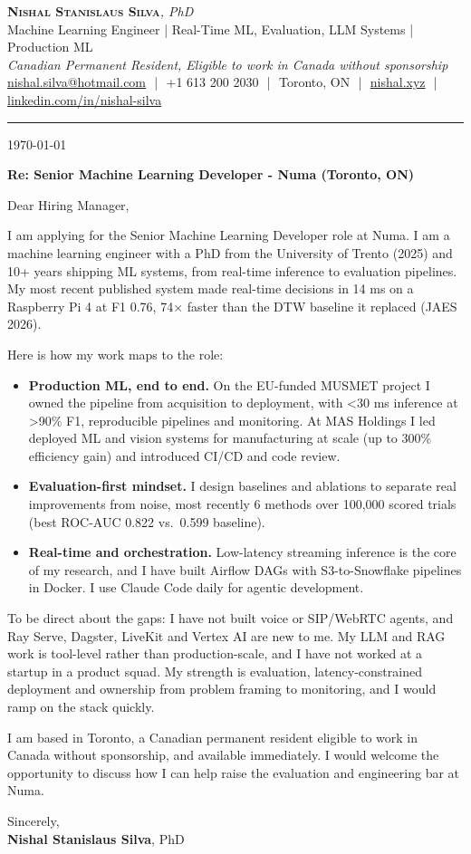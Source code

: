 \documentclass[11pt]{article}
\makeatletter
\newcommand{\clName}{Nishal Stanislaus Silva}
\newcommand{\clEmail}{nishal.silva@hotmail.com}
\newcommand{\clPhone}{+1 613 200 2030}
\newcommand{\clCity}{Toronto, ON}
\newcommand{\clSite}{https://nishal.xyz}
\newcommand{\clLinkedIn}{https://www.linkedin.com/in/nishal-silva}
\newcommand{\clStatus}{Canadian Permanent Resident, Eligible to work in Canada without sponsorship}
\newcommand{\clTagline}{Machine Learning Engineer | Real-Time ML, Evaluation, LLM Systems | Production ML}
\newcommand{\clRole}{Senior Machine Learning Developer}
\newcommand{\clCompany}{Numa}
\newcommand{\clAddressee}{Dear Hiring Manager,}
\makeatother
\begin{document}
\pagestyle{empty}

\begin{center}
    {\LARGE \scshape \textbf{\clName}}{\large \textit{, PhD}}
    \\[1pt]
    {\small \clTagline}
    \\[1pt]
    {\footnotesize\textit{\clStatus}}
    \\[1pt]
    {\small
    \href{mailto:\clEmail}{\clEmail}
    \,\,|\,\, \clPhone
    \,\,|\,\, \clCity
    \,\,|\,\, \href{\clSite}{nishal.xyz}
    \,\,|\,\, \href{\clLinkedIn}{linkedin.com/in/nishal-silva}}
\end{center}

\rule{\linewidth}{0.4pt}\vspace{0.6em}

\today

\textbf{Re: \clRole{} - \clCompany{} (Toronto, ON)}

\clAddressee

I am applying for the \clRole{} role at \clCompany{}. I am a machine learning engineer with a PhD from the University of Trento (2025) and 10+ years shipping ML systems, from real-time inference to evaluation pipelines. My most recent published system made real-time decisions in 14 ms on a Raspberry Pi 4 at F1 0.76, 74$\times$ faster than the DTW baseline it replaced (JAES 2026).

Here is how my work maps to the role:
\begin{itemize}[leftmargin=1.4em, itemsep=0.1em, topsep=0.2em]
    \item \textbf{Production ML, end to end.} On the EU-funded MUSMET project I owned the pipeline from acquisition to deployment, with <30 ms inference at >90\% F1, reproducible pipelines and monitoring. At MAS Holdings I led deployed ML and vision systems for manufacturing at scale (up to 300\% efficiency gain) and introduced CI/CD and code review.
    \item \textbf{Evaluation-first mindset.} I design baselines and ablations to separate real improvements from noise, most recently 6 methods over 100,000 scored trials (best ROC-AUC 0.822 vs.\ 0.599 baseline).
    \item \textbf{Real-time and orchestration.} Low-latency streaming inference is the core of my research, and I have built Airflow DAGs with S3-to-Snowflake pipelines in Docker. I use Claude Code daily for agentic development.
\end{itemize}
To be direct about the gaps: I have not built voice or SIP/WebRTC agents, and Ray Serve, Dagster, LiveKit and Vertex AI are new to me. My LLM and RAG work is tool-level rather than production-scale, and I have not worked at a startup in a product squad. My strength is evaluation, latency-constrained deployment and ownership from problem framing to monitoring, and I would ramp on the stack quickly.

I am based in Toronto, a Canadian permanent resident eligible to work in Canada without sponsorship, and available immediately. I would welcome the opportunity to discuss how I can help raise the evaluation and engineering bar at \clCompany{}.

\vspace{8pt}
Sincerely,\\[2pt]
\textbf{\clName}, PhD
\end{document}
